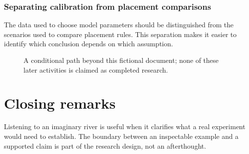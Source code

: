 \subsubsection{Separating calibration from placement comparisons}\label{demo-outlook-separation}
The data used to choose model parameters should be distinguished from the scenarios used to compare placement rules. This separation makes it easier to identify which conclusion depends on which assumption.
\begin{figure}[htbp]
\centering
{}
\caption{A conditional path beyond this fictional document; none of these later activities is claimed as completed research.}\label{demo-fig-outlook}
\end{figure}
\section{Closing remarks}\label{demo-outlook-closing}
Listening to an imaginary river is useful when it clarifies what a real experiment would need to establish. The boundary between an inspectable example and a supported claim is part of the research design, not an afterthought.
